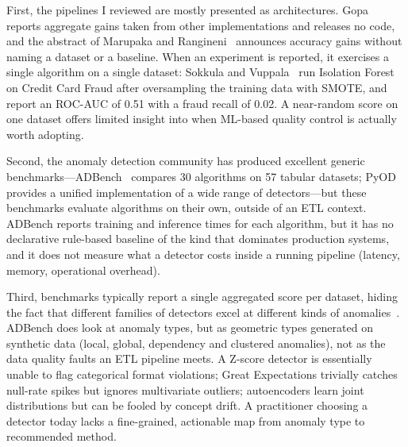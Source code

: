 \documentclass[conference]{IEEEtran}
\begin{document}
First, the pipelines I reviewed are mostly presented as
architectures. Gopa~\cite{gopa2025aiaugmented} reports aggregate gains
taken from other implementations and releases no code, and the abstract
of Marupaka and Rangineni~\cite{marupaka2024mlpredictive} announces
accuracy gains without naming a dataset or a baseline. When an
experiment is reported, it exercises a single algorithm on a single
dataset: Sokkula and Vuppala~\cite{sokkula2024implementing} run
Isolation Forest on Credit Card Fraud after oversampling the training
data with SMOTE, and report an ROC-AUC of 0.51 with a fraud recall of
0.02. A near-random score on one dataset offers limited insight into
when ML-based quality control is actually worth adopting.

Second, the anomaly detection community has produced excellent
generic benchmarks---ADBench~\cite{han2022adbench} compares 30
algorithms on 57 tabular datasets; PyOD~\cite{zhao2019pyod} provides a
unified implementation of a wide range of detectors---but these benchmarks
evaluate algorithms on their own, outside of an ETL context. ADBench
reports training and inference times for each algorithm, but it has no
declarative rule-based baseline of the kind that dominates production
systems, and it does not measure what a detector costs inside a running
pipeline (latency, memory, operational overhead).

Third, benchmarks typically report a single aggregated score per
dataset, hiding the fact that different families of detectors excel at
different kinds of anomalies~\cite{goldstein2016comparative}. ADBench does look at anomaly types, but
as geometric types generated on synthetic data (local, global,
dependency and clustered anomalies), not as the data quality faults an
ETL pipeline meets. A Z-score detector is essentially unable
to flag categorical format violations; Great Expectations trivially
catches null-rate spikes but ignores multivariate
outliers; autoencoders learn joint
distributions but can be fooled by concept drift. A practitioner
choosing a detector today lacks a fine-grained, actionable map from
anomaly type to recommended method.
\end{document}
